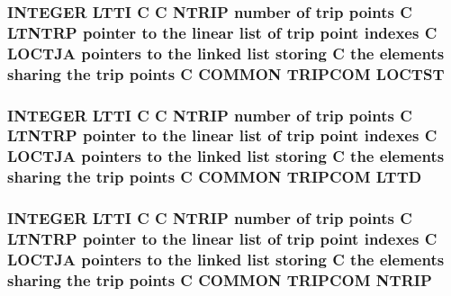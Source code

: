 \hypertarget{trip_8com_a1da3a79d56d60efb2ec802079caef607}{
\subsubsection[{L\-O\-C\-T\-S\-T}]{\setlength{\rightskip}{0pt plus 5cm}I\-N\-T\-E\-G\-E\-R L\-T\-T\-I C C {\bf N\-T\-R\-I\-P} number of trip points C L\-T\-N\-T\-R\-P pointer to the linear list of trip point indexes C {\bf L\-O\-C\-T\-J\-A} pointers to the linked list storing C the elements sharing the trip points C C\-O\-M\-M\-O\-N T\-R\-I\-P\-C\-O\-M L\-O\-C\-T\-S\-T}}\label{trip_8com_a1da3a79d56d60efb2ec802079caef607}
\hypertarget{trip_8com_a0d4fc998108c0f869ce087a3b54bdca6}{
\subsubsection[{L\-T\-T\-D}]{\setlength{\rightskip}{0pt plus 5cm}I\-N\-T\-E\-G\-E\-R L\-T\-T\-I C C {\bf N\-T\-R\-I\-P} number of trip points C L\-T\-N\-T\-R\-P pointer to the linear list of trip point indexes C {\bf L\-O\-C\-T\-J\-A} pointers to the linked list storing C the elements sharing the trip points C C\-O\-M\-M\-O\-N T\-R\-I\-P\-C\-O\-M L\-T\-T\-D}}\label{trip_8com_a0d4fc998108c0f869ce087a3b54bdca6}
\hypertarget{trip_8com_a3d7b914361a6e11bdeb7e6b866517781}{
\subsubsection[{N\-T\-R\-I\-P}]{\setlength{\rightskip}{0pt plus 5cm}I\-N\-T\-E\-G\-E\-R L\-T\-T\-I C C N\-T\-R\-I\-P number of trip points C L\-T\-N\-T\-R\-P pointer to the linear list of trip point indexes C {\bf L\-O\-C\-T\-J\-A} pointers to the linked list storing C the elements sharing the trip points C C\-O\-M\-M\-O\-N T\-R\-I\-P\-C\-O\-M N\-T\-R\-I\-P}}\label{trip_8com_a3d7b914361a6e11bdeb7e6b866517781}
